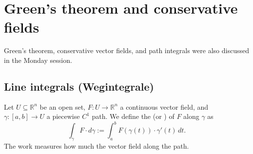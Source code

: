 
\section{Green's theorem and conservative fields}
\label{sec:greens_theorem_conservative_fields}

\begin{ainote}
Green's theorem, conservative vector fields, and path integrals were also discussed in the Monday session. 
\end{ainote}

\subsection{Line integrals (Wegintegrale)}

\begin{definition}
\label{def:line_integral}
Let $U \subseteq \mathbb{R}^n$ be an open set, $F : U \to \mathbb{R}^n$ a continuous vector field, and $\gamma : [a,b] \to U$ a piecewise $C^1$ path. We define the  (or ) of $F$ along $\gamma$ as
\[\int_\gamma F \cdot d\gamma := \int_a^b F(\gamma(t)) \cdot \gamma'(t) \,dt.\]
The work measures how much the vector field  along the path.
\end{definition}

